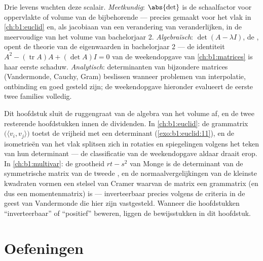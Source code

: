 \begin{remark}
\label{rem:b1:det:whereused}
Drie levens wachten deze scalair. \emph{Meetkundig}: $\abs{\det}$
is de schaalfactor voor oppervlakte of volume van de bijbehorende
 --- precies gemaakt voor het vlak in
\cref{ch:b1:euclid} en, als jacobiaan van een verandering van
veranderlijken, in de meervoudige  van het volume van
bachelorjaar 2. \emph{Algebraïsch}: $\det(A - \lambda I)$, de
, opent de theorie van de eigenwaarden in
bachelorjaar 2 --- de identiteit $A^2 - (\operatorname{tr} A)A +
(\det A)I = 0$ van de weekendopgave van \cref{ch:b1:matrices} is
haar eerste schaduw. \emph{Analytisch}: determinanten van
bijzondere matrices (Vandermonde, Cauchy, Gram) beslissen wanneer
problemen van interpolatie, ontbinding en  goed gesteld
zijn; de weekendopgave hieronder evalueert de eerste twee families
volledig.
\end{remark}

\begin{remark}
\label{rem:b1:det:perspectives}
Dit hoofdstuk sluit de ruggengraat van de  algebra van het
volume af, en de twee resterende hoofdstukken innen de dividenden.
In \cref{ch:b1:euclid}: de gram\-matrix $\bigl(\langle v_i,
v_j\rangle\bigr)$ toetst de vrijheid met een determinant
(\cref{exo:b1:euclid:11}), en de isometrieën van het vlak splitsen
zich in rotaties en spiegelingen volgens het teken van hun
determinant --- de classificatie van de weekendopgave aldaar draait
erop. In \cref{ch:b1:multivar}: de grootheid $rt - s^2$ van Monge
is de determinant van de symmetrische matrix van de tweede
, en de normaalvergelijkingen van de kleinste kwadraten
vormen een stelsel van Cramer waarvan de matrix een grammatrix (en
dus een momentenmatrix) is --- inverteerbaar precies volgens de
criteria in de geest van Vandermonde die hier zijn vastgesteld.
Wanneer die hoofdstukken ``inverteerbaar'' of ``positief''
beweren, liggen de bewijsstukken in dit hoofdstuk.
\end{remark}

\section{Oefeningen}

